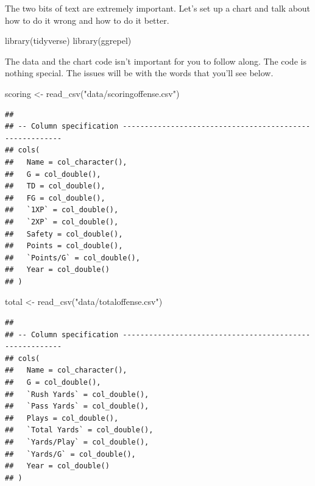 \documentclass[
]{book}
\newenvironment{Shaded}{\begin{snugshade}}{\end{snugshade}}
\newcommand{\FunctionTok}[1]{\textcolor[rgb]{0.00,0.00,0.00}{#1}}
\newcommand{\NormalTok}[1]{#1}
\newcommand{\OtherTok}[1]{\textcolor[rgb]{0.56,0.35,0.01}{#1}}
\newcommand{\StringTok}[1]{\textcolor[rgb]{0.31,0.60,0.02}{#1}}
\begin{document}
The two bits of text are extremely important. Let's set up a chart and talk about how to do it wrong and how to do it better.

\begin{Shaded}
\begin{Highlighting}[]
\FunctionTok{library}\NormalTok{(tidyverse)}
\FunctionTok{library}\NormalTok{(ggrepel)}
\end{Highlighting}
\end{Shaded}

The data and the chart code isn't important for you to follow along. The code is nothing special. The issues will be with the words that you'll see below.

\begin{Shaded}
\begin{Highlighting}[]
\NormalTok{scoring }\OtherTok{\textless{}{-}} \FunctionTok{read\_csv}\NormalTok{(}\StringTok{"data/scoringoffense.csv"}\NormalTok{)}
\end{Highlighting}
\end{Shaded}

\begin{verbatim}
## 
## -- Column specification --------------------------------------------------------
## cols(
##   Name = col_character(),
##   G = col_double(),
##   TD = col_double(),
##   FG = col_double(),
##   `1XP` = col_double(),
##   `2XP` = col_double(),
##   Safety = col_double(),
##   Points = col_double(),
##   `Points/G` = col_double(),
##   Year = col_double()
## )
\end{verbatim}

\begin{Shaded}
\begin{Highlighting}[]
\NormalTok{total }\OtherTok{\textless{}{-}} \FunctionTok{read\_csv}\NormalTok{(}\StringTok{"data/totaloffense.csv"}\NormalTok{)}
\end{Highlighting}
\end{Shaded}

\begin{verbatim}
## 
## -- Column specification --------------------------------------------------------
## cols(
##   Name = col_character(),
##   G = col_double(),
##   `Rush Yards` = col_double(),
##   `Pass Yards` = col_double(),
##   Plays = col_double(),
##   `Total Yards` = col_double(),
##   `Yards/Play` = col_double(),
##   `Yards/G` = col_double(),
##   Year = col_double()
## )
\end{verbatim}
\end{document}
